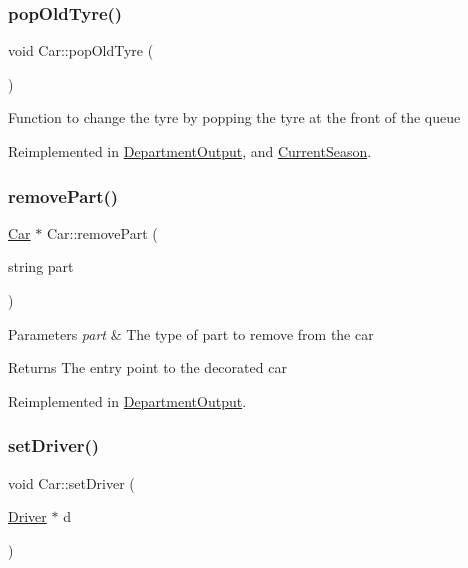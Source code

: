 \subsubsection{\texorpdfstring{pop\+Old\+Tyre()}{popOldTyre()}}
{\footnotesize\ttfamily void Car\+::pop\+Old\+Tyre (\begin{DoxyParamCaption}{ }\end{DoxyParamCaption})\hspace{0.3cm}{\ttfamily [virtual]}}

Function to change the tyre by popping the tyre at the front of the queue 

Reimplemented in \hyperlink{classDepartmentOutput_a9c1846e268ea5e85eb623d8011f204f5}{Department\+Output}, and \hyperlink{classCurrentSeason_a4d58f649f43cc8ea8c1e7e0745b7dc1f}{Current\+Season}.

\mbox{\label{classCar_a54018ac7e84e79c8bfc1a8fba5e45b16}} 
\subsubsection{\texorpdfstring{remove\+Part()}{removePart()}}
{\footnotesize\ttfamily \hyperlink{classCar}{Car} $\ast$ Car\+::remove\+Part (\begin{DoxyParamCaption}\item[{string}]{part }\end{DoxyParamCaption})\hspace{0.3cm}{\ttfamily [virtual]}}


\begin{DoxyParams}{Parameters}
{\em part} & The type of part to remove from the car \\
\hline
\end{DoxyParams}
\begin{DoxyReturn}{Returns}
The entry point to the decorated car 
\end{DoxyReturn}


Reimplemented in \hyperlink{classDepartmentOutput_a8bd91d321113668938ecb8fb549d972c}{Department\+Output}.

\mbox{\label{classCar_ad7148bd1abe107ce2e2b134f78582c9d}} 
\subsubsection{\texorpdfstring{set\+Driver()}{setDriver()}}
{\footnotesize\ttfamily void Car\+::set\+Driver (\begin{DoxyParamCaption}\item[{\hyperlink{classDriver}{Driver} $\ast$}]{d }\end{DoxyParamCaption})\hspace{0.3cm}{\ttfamily [virtual]}}

